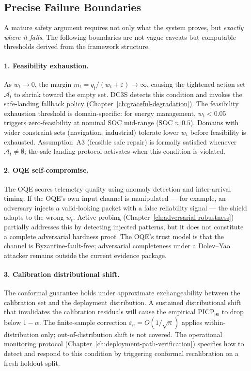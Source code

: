 \subsection{Precise Failure Boundaries}
\label{sec:precise-failure-boundaries}

A mature safety argument requires not only what the system proves, but
\emph{exactly where it fails}.  The following boundaries are not vague
caveats but computable thresholds derived from the framework structure.

\paragraph{1. Feasibility exhaustion.}
As $w_t \to 0$, the margin $m_t = q_t / (w_t + \varepsilon) \to \infty$,
causing the tightened action set $\mathcal{A}_t$ to shrink toward the
empty set.  DC3S detects this condition and invokes the safe-landing
fallback policy (Chapter~\ref{ch:graceful-degradation}).  The feasibility
exhaustion threshold is domain-specific: for energy management, $w_t < 0.05$
triggers zero-feasibility at nominal SOC mid-range ($\mathrm{SOC} \approx 0.5$).
Domains with wider constraint sets (navigation, industrial) tolerate lower
$w_t$ before feasibility is exhausted.  Assumption~A3 (feasible safe repair)
is formally satisfied whenever $\mathcal{A}_t \ne \emptyset$; the
safe-landing protocol activates when this condition is violated.

\paragraph{2. OQE self-compromise.}
The OQE scores telemetry quality using anomaly detection and inter-arrival
timing.  If the OQE's own input channel is manipulated --- for example, an
adversary injects a valid-looking packet with a false reliability signal
--- the shield adapts to the wrong $w_t$.  Active probing
(Chapter~\ref{ch:adversarial-robustness}) partially addresses this by
detecting injected patterns, but it does not constitute a complete
adversarial hardness proof.  The OQE's trust model is that the channel is
Byzantine-fault-free; adversarial completeness under a Dolev--Yao attacker
remains outside the current evidence package.

\paragraph{3. Calibration distributional shift.}
The conformal guarantee holds under approximate exchangeability between the
calibration set and the deployment distribution.  A sustained distributional
shift that invalidates the calibration residuals will cause the empirical
$\mathrm{PICP}_{90}$ to drop below $1 - \alpha$.  The finite-sample
correction $\varepsilon_n = O(1/\sqrt{n})$ applies within-distribution
only; out-of-distribution shift is not covered.  The operational monitoring
protocol (Chapter~\ref{ch:deployment-path-verification}) specifies how to
detect and respond to this condition by triggering conformal recalibration
on a fresh holdout split.

